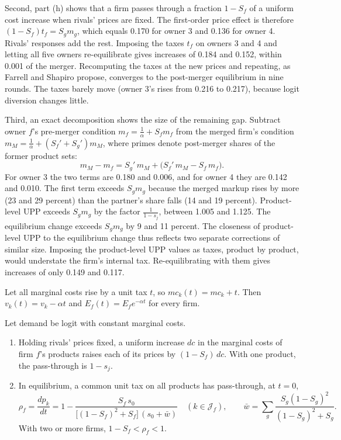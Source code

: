 Second, part (h) shows that a firm passes through a fraction $1 - S_f$ of a uniform cost increase when rivals'
prices are fixed. The first-order price effect is therefore $(1 - S_f)t_f = S_gm_g$, which equals 0.170 for owner 3
and 0.136 for owner 4. Rivals' responses add the rest. Imposing the taxes $t_f$ on owners 3 and 4 and letting all
five owners re-equilibrate gives increases of 0.184 and 0.152, within 0.001 of the merger. Recomputing the taxes at
the new prices and repeating, as Farrell and Shapiro propose, converges to the post-merger equilibrium in nine rounds.
The taxes barely move (owner 3's rises from 0.216 to 0.217), because logit diversion changes little.

Third, an exact decomposition shows the size of the remaining gap. Subtract owner $f$'s pre-merger condition
$m_f = \frac{1}{\alpha} + S_fm_f$ from the merged firm's condition $m_M = \frac{1}{\alpha} + (S_f' + S_g')m_M$, where
primes denote post-merger shares of the former product sets:
\begin{equation}\label{eq:C-merger-decomp}
  m_M - m_f = S_g'\,m_M + \big(S_f'\,m_M - S_f\,m_f\big) .
\end{equation}
For owner 3 the two terms are 0.180 and 0.006, and for owner 4 they are 0.142 and 0.010. The first term exceeds
$S_gm_g$ because the merged markup rises by more (23 and 29 percent) than the partner's share falls (14 and 19
percent). Product-level UPP exceeds $S_gm_g$ by the factor $\frac{1}{1 - s_j}$, between 1.005 and 1.125. The equilibrium
change exceeds $S_gm_g$ by 9 and 11 percent. The closeness of product-level UPP to the equilibrium change thus
reflects two separate corrections of similar size. Imposing the product-level UPP values as taxes, product by
product, would understate the firm's internal tax. Re-equilibrating with them gives increases of only 0.149 and
0.117.

Let all marginal costs rise by a unit tax $t$, so $mc_k(t) = mc_k + t$. Then $v_k(t) = v_k - \alpha t$ and
$E_f(t) = E_fe^{-\alpha t}$ for every firm.

\begin{proposition}\label{prop:C-logit-passthrough}
Let demand be logit with constant marginal costs.
\begin{enumerate}[label=(\roman*)]
  \item Holding rivals' prices fixed, a uniform increase $dc$ in the marginal costs of firm $f$'s products raises
  each of its prices by $(1 - S_f)\,dc$. With one product, the pass-through is $1 - s_j$.
  \item In equilibrium, a common unit tax on all products has pass-through, at $t = 0$,
  \begin{equation}\label{eq:C-tax-pt}
    \rho_f = \frac{dp_k}{dt} = 1 - \frac{S_f\,s_0}{\big[(1 - S_f)^2 + S_f\big]\,(s_0 + \bar w)} \quad (k \in \mathcal{J}_f) ,
    \qquad \bar w = \sum_g\frac{S_g(1 - S_g)^2}{(1 - S_g)^2 + S_g} .
  \end{equation}
  With two or more firms, $1 - S_f < \rho_f < 1$.
\end{enumerate}
\end{proposition}

